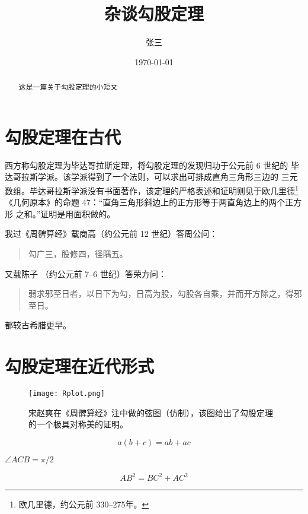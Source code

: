\documentclass[UTF8]{ctexart}
\title{杂谈勾股定理}
\author{张三}
\date{\today}
\begin{document}
\maketitle


\begin{abstract}
这是一篇关于勾股定理的小短文
\end{abstract}

\tableofcontents

\section{勾股定理在古代}
西方称勾股定理为毕达哥拉斯定理，将勾股定理的发现归功于公元前 6 世纪的
毕达哥拉斯学派。该学派得到了一个法则，可以求出可排成直角三角形三边的
三元数组。毕达哥拉斯学派没有书面著作，该定理的严格表述和证明则见于欧几里德\footnote{欧几里德，约公元前 330--275年。}
《几何原本》的命题 47：“直角三角形斜边上的正方形等于两直角边上的两个正方形
之和。”证明是用面积做的。

我过《周髀算经》载商高（约公元前 12 世纪）答周公问：
\begin{quote}
\kaishu 勾广三，股修四，径隅五。
\end{quote}
又载陈子 （约公元前 7--6 世纪）答荣方问：
\begin{quote}
\kaishu 弱求邪至日者，以日下为勾，日高为股，勾股各自乘，并而开方除之，得邪至日。
\end{quote}
都较古希腊更早。

\section{勾股定理在近代形式}



\begin{figure}[ht]
\centering
\texttt{[image: Rplot.png]}
\caption{宋赵爽在《周髀算经》注中做的弦图（仿制），该图给出了勾股定理的一个极具对称美的证明。}
\label{fig:Rplot}
\end{figure}

\begin{equation}
a(b+c) = ab + ac
\end{equation}

$\angle ACB = \pi /2 $

\begin{equation}
AB^2 = BC^2 + AC^2
\end{equation}
\end{document}
